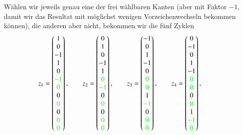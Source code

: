 Wählen wir jeweils genau
eine der frei wählbaren Kanten (aber mit Faktor $-1$, damit wir das Resultat
mit möglichst wenigen Vorzeichenwechseln bekommen können),
die anderen aber nicht, bekommen wir die fünf Zyklen
\[
z_1=\begin{pmatrix}  1\\ 0\\-1\\ 1\\ 0\\\color{green}-1\\\color{green} 0\\ 0\\\color{green} 0\\ 0\\\color{green} 0\\\color{green} 0\end{pmatrix},\qquad
z_2=\begin{pmatrix}  0\\ 1\\ 0\\-1\\ 1\\\color{green} 0\\\color{green}-1\\ 0\\\color{green} 0\\ 0\\\color{green} 0\\\color{green} 0\end{pmatrix},\qquad
z_3=\begin{pmatrix} -1\\ 0\\ 1\\-1\\ 0\\\color{green} 0\\\color{green} 0\\ 1\\\color{green}-1\\ 0\\\color{green} 0\\\color{green} 0\end{pmatrix},\qquad
z_4=\begin{pmatrix}  0\\-1\\ 0\\ 1\\-1\\\color{green} 0\\\color{green} 0\\ 0\\\color{green} 0\\ 1\\\color{green}-1\\\color{green} 0\end{pmatrix},\qquad
\]
